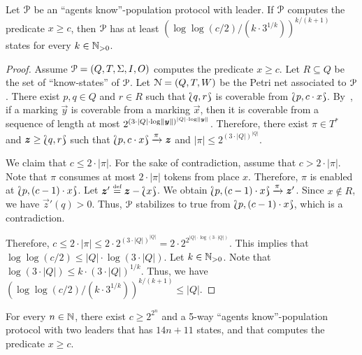 \begin{theorem}
  Let $\mathcal{P}$ be an ``agents know''-population protocol with leader. If
  $\mathcal{P}$ computes the predicate $x \geq c$, then $\mathcal{P}$ has at least
  $(\log \log(c / 2) / (k \cdot 3^{1 / k}))^{k / (k + 1)}$ states for
  every $k \in \mathbb{N}_{>0}$. 
\end{theorem}

\begin{proof}
  Assume $\mathcal{P} = (Q, T, \Sigma, I, O)$ computes the predicate $x \geq
  c$. Let $R \subseteq Q$ be the set of ``know-states'' of $\mathcal{P}$. Let
  $\mathcal{N} = (Q, T, W)$ be the Petri net associated to $\mathcal{P}$. There exist
  $p, q \in Q$ and $r \in R$ such that $\Lbag q, r\Rbag$ is coverable
  from $\Lbag p, c \cdot x\Rbag$. By~\cite{Rac78}, if a marking
  $\vec{y}$ is coverable from a marking $\vec{x}$, then it is
  coverable from a sequence of length at most $2^{{(3 \cdot |Q| \cdot
      \log \lVert\bm{y}\rVert)}^{|Q| \cdot \log
      \lVert\bm{y}\rVert}}$. Therefore, there exist $\pi \in T^*$ and
  $\bm{z} \geq \Lbag q, r\Rbag$ such that $\Lbag p, c \cdot x\Rbag
  \xrightarrow{\pi} \bm{z}$ and $|\pi| \leq 2^{(3 \cdot |Q|)^{|Q|}}$.

  We claim that $c \leq 2 \cdot |\pi|$. For the sake of contradiction,
  assume that $c > 2 \cdot |\pi|$. Note that $\pi$ consumes at most $2
  \cdot |\pi|$ tokens from place $x$. Therefore, $\pi$ is enabled at
  $\Lbag p, (c - 1) \cdot x\Rbag$. Let $\bm{z}' \stackrel{\scriptscriptstyle\text{def}}{=} \bm{z} -
  \Lbag x\Rbag$. We obtain $\Lbag p, (c-1) \cdot x\Rbag \xrightarrow{\pi}
  \bm{z}'$. Since $x \not\in R$, we have $\vec{z}'(q) > 0$. Thus,
  $\mathcal{P}$ stabilizes to true from $\Lbag p, (c-1) \cdot x\Rbag$, which
  is a contradiction.

  Therefore, $c \leq 2 \cdot |\pi| \leq 2 \cdot 2^{(3 \cdot
    |Q|)^{|Q|}} = 2 \cdot 2^{2^{|Q| \cdot \log(3 \cdot |Q|)}}$. This
  implies that $\log \log (c / 2) \leq |Q| \cdot \log(3 \cdot
  |Q|)$. Let $k \in \mathbb{N}_{>0}$. Note that $\log(3 \cdot |Q|) \leq k
  \cdot (3 \cdot |Q|)^{1 / k}$. Thus, we have $(\log \log(c / 2) / (k
  \cdot 3^{1 / k}))^{k / (k + 1)} \leq |Q|$.
\end{proof}

\begin{theorem}
  For every $n \in \mathbb{N}$, there exist $c \geq 2^{2^n}$ and a 5-way
  ``agents know''-population protocol with two leaders that has $14n +
  11$ states, and that computes the predicate $x \geq c$.
\end{theorem}

